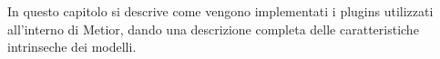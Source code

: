In questo capitolo si descrive come vengono implementati i plugins utilizzati all'interno di Metior,
dando una descrizione completa delle caratteristiche intrinseche dei modelli.
